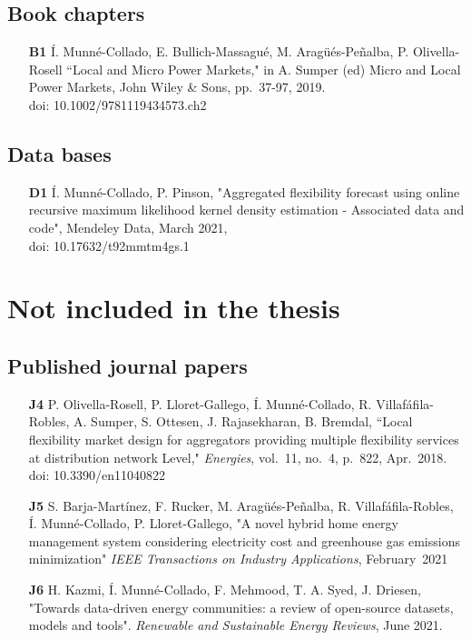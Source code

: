 \subsection*{Book chapters}

\begin{itemize}
	\item[\textbf{B1}] \'{I}. Munn\'{e}-Collado, E. Bullich-Massagu\'{e}, M. Arag\"{u}\'{e}s-Pe\~{n}alba, P. Olivella-Rosell ``Local and Micro Power Markets," in A. Sumper (ed) Micro and Local Power Markets, John Wiley \& Sons, pp.~37-97, 2019. \\doi: 10.1002/9781119434573.ch2
\end{itemize}

\subsection*{Data bases}

\begin{itemize}
	\item [\textbf{D1}] \'{I}. Munn\'{e}-Collado, P. Pinson, "Aggregated flexibility forecast using online recursive maximum likelihood kernel density estimation - Associated data and code", Mendeley Data, March 2021,  \\doi: 10.17632/t92mmtm4gs.1
\end{itemize}

\section*{Not included in the thesis}

\subsection*{Published journal papers}

\begin{itemize}
	
		\item [\textbf{J4}] P. Olivella-Rosell, P. Lloret-Gallego, \'{I}. Munn\'{e}-Collado, R. Villaf\'{a}fila-Robles, A. Sumper, S. Ottesen, J. Rajasekharan, B. Bremdal, ``Local flexibility market design for aggregators providing multiple flexibility services at distribution network Level," \textit{Energies}, vol.~11, no.~4, p.~822, Apr.~2018. doi: 10.3390/en11040822
	\item [\textbf{J5}]  S. Barja-Mart\'{i}nez, F. Rucker, M. Arag\"{u}\'{e}s-Pe\~{n}alba, R. Villaf\'{a}fila-Robles, \'{I}. Munn\'{e}-Collado, P. Lloret-Gallego, "A novel hybrid home energy management system considering electricity cost and greenhouse gas emissions minimization" \textit{IEEE Transactions on Industry Applications}, February~2021
	\item [\textbf{J6}] H. Kazmi, \'{I}. Munn\'{e}-Collado, F. Mehmood, T. A. Syed, J. Driesen, "Towards data-driven energy communities: a review of open-source datasets, models and tools". \textit{Renewable and Sustainable Energy Reviews}, June 2021.
\end{itemize}

